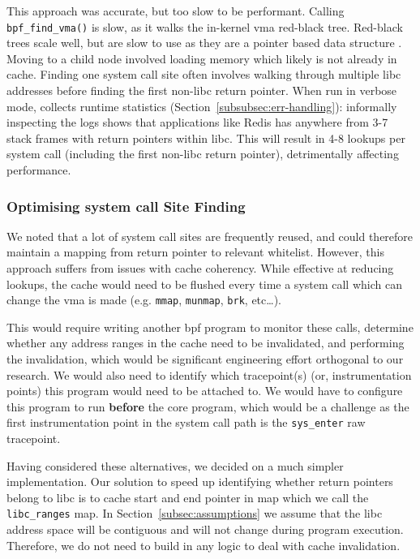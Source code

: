 This approach was accurate, but too slow to be performant. Calling \texttt{bpf\_find\_vma()} is
slow, as it walks the in-kernel \ac{vma} red-black tree. Red-black trees scale
well, but are slow to use as they are a pointer based data structure \cite{pointer-based-ds-slow}. Moving to
a child node involved loading memory which likely is not already in cache.
Finding one system call site often involves walking through multiple \ac{libc}
addresses before finding the first non-\ac{libc} return pointer. When run in
verbose mode, \af collects runtime statistics
(Section~\ref{subsubsec:err-handling}): informally inspecting the logs shows that
applications like Redis has anywhere from 3-7 stack frames with return pointers 
within \ac{libc}. This will result in 4-8 lookups per system call (including the
first non-\ac{libc} return pointer), detrimentally affecting performance.

\subsubsection{Optimising system call Site
Finding}\label{subsubsec:impl-find-site-opt}

We noted that a lot of system call sites are frequently reused, and could
therefore maintain a mapping from return pointer to relevant whitelist. However,
this approach suffers from issues with cache coherency. While effective at
reducing lookups, the cache would need to be flushed every time a system call which
can change the \ac{vma} is made (e.g. \texttt{mmap}, \texttt{munmap},
\texttt{brk}, etc\dots). 

This would require writing another \ac{bpf} program to
monitor these calls, determine whether any address ranges in the cache need to
be invalidated, and performing the invalidation, which would be significant
engineering effort orthogonal to our research. We would also need to identify
which tracepoint(s) (or, instrumentation points) this program would need to be
attached to. We would have to configure this program to run \textbf{before} the
\af core program, which would be a challenge as the first instrumentation point
in the system call path is the \texttt{sys\_enter} raw tracepoint.

Having considered these alternatives, we decided on a much simpler
implementation. Our solution to speed up identifying whether return pointers
belong to \ac{libc} is to cache  start and end pointer in 
map which we call the \texttt{libc\_ranges} map. In 
Section~\ref{subsec:assumptions} we assume that the  \ac{libc} address space 
will be contiguous and will not change during program execution. Therefore, we
do not need to build in any logic to deal with cache invalidation.

